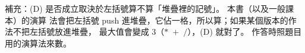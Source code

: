 \begin{pastsoln}
補充：(D) 是否成立取決於左括號算不算「堆疊裡的記號」。 本書（以及一般課本）的演算
法會把左括號 push 進堆疊，它佔一格，所以算；如果某個版本的作法不把左括號放進堆疊，
最大值會變成 $3$（$*\;+\;/$），(D) 就對了。 作答時照題目用的演算法來數。
\end{pastsoln}
